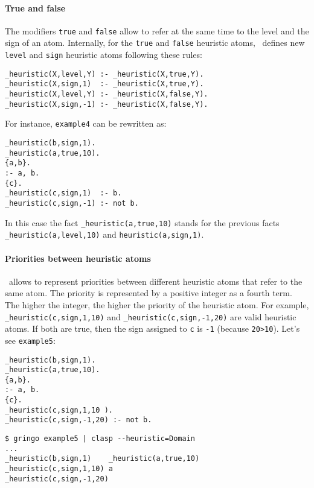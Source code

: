 \paragraph{True and false}

 The modifiers \texttt{true} and \texttt{false} allow to refer at the same time to the level and the sign of an atom.
 Internally,  for the \texttt{true} and \texttt{false} heuristic atoms,
 \clasp\ defines new \texttt{level} and \texttt{sign} heuristic atoms following these rules:
\begin{verbatim}
_heuristic(X,level,Y) :- _heuristic(X,true,Y).
_heuristic(X,sign,1)  :- _heuristic(X,true,Y).
_heuristic(X,level,Y) :- _heuristic(X,false,Y).
_heuristic(X,sign,-1) :- _heuristic(X,false,Y).
\end{verbatim}

For instance, \texttt{example4} can be rewritten as:
\begin{verbatim}
_heuristic(b,sign,1).
_heuristic(a,true,10).
{a,b}.
:- a, b.
{c}.
_heuristic(c,sign,1)  :- b.
_heuristic(c,sign,-1) :- not b.
\end{verbatim}

In this case the fact \texttt{\_heuristic(a,true,10)} stands for the previous
facts \texttt{\_heuristic(a,level,10)} and \texttt{heuristic(a,sign,1)}.

\paragraph{Priorities between heuristic atoms}

\clasp\ allows to represent priorities between different heuristic atoms that refer to the same atom.
The priority is represented by a positive integer as a fourth term.
The higher the integer, the higher the priority of the heuristic atom.
For example, \texttt{\_heuristic(c,sign,1,10)} and \texttt{\_heuristic(c,sign,-1,20)} are valid heuristic atoms.
If both are true, then the sign assigned to \texttt{c} is \texttt{-1} (because \texttt{20>10}).  Let's see \texttt{example5}:
\begin{verbatim}
_heuristic(b,sign,1).
_heuristic(a,true,10).
{a,b}.
:- a, b.
{c}.
_heuristic(c,sign,1,10 ).
_heuristic(c,sign,-1,20) :- not b.
\end{verbatim}
\begin{verbatim}
$ gringo example5 | clasp --heuristic=Domain
...
_heuristic(b,sign,1)    _heuristic(a,true,10)
_heuristic(c,sign,1,10) a
_heuristic(c,sign,-1,20)\end{verbatim}

